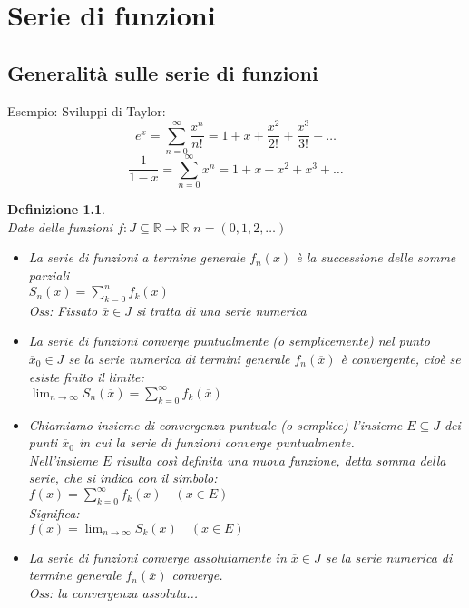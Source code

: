\documentclass{scrreprt}
\newtheorem{defn}{Definizione}
\newenvironment{definition}{\begin{mdframed}[backgroundcolor=Ivory2]\begin{defn}}{\end{defn}\end{mdframed}}
\begin{document}
\chapter{Serie di funzioni}


\section{Generalità sulle serie di funzioni}
Esempio: Sviluppi di Taylor:
\begin{equation}
e^x = \sum_{n=0}^\infty \frac{x^n}{n!} = 1 + x + \frac{x^2}{2!} + \frac{x^3}{3!} + \ldots
\end{equation}
\begin{equation}
	\frac{1}{1-x} = \sum_{n=0}^\infty x^n = 1 + x + x^2 + x^3 + \ldots
\end{equation}

\begin{definition}
	\ \\
	Date delle funzioni $f: J\subseteq\mathbb{R}\to\mathbb{R}$ \quad $n=(0,1,2,\ldots)$
	\begin{itemize}
		\item La serie di funzioni a termine generale $f_n(x)$ è la successione delle somme parziali \\ $S_n(x) = \sum_{k=0}^n f_k(x)$\\
				\emph{Oss: }Fissato $\overline{x}\in J$ si tratta di una serie numerica
		\item La serie di funzioni converge puntualmente (o semplicemente) nel punto $\overline{x}_0\in J$ se la serie numerica di termini generale $f_n(\overline{x})$ è convergente, cioè se esiste finito il limite: \\ $\lim_{n\to\infty} S_n(\overline{x}) = \sum_{k=0}^\infty f_k(\overline{x})$
		\item Chiamiamo insieme di convergenza puntuale (o semplice) l'insieme $E \subseteq J$ dei punti $\overline{x}_0$ in cui la serie di funzioni converge puntualmente.\\ Nell'insieme $E$ risulta così definita una nuova funzione, detta somma della serie, che si indica con il simbolo: \\ $f(x) = \sum_{k=0}^\infty f_k(x) \quad (x \in E)$\\ Significa: \\ $f(x) = \lim_{n\to\infty} S_k(x) \quad (x \in E)$
		\item La serie di funzioni converge assolutamente in $\overline{x} \in J$ se la serie numerica di termine generale $f_n(\overline{x})$ converge.\\ \emph{Oss:} la convergenza assoluta...
	\end{itemize}
\end{definition}
\end{document}
